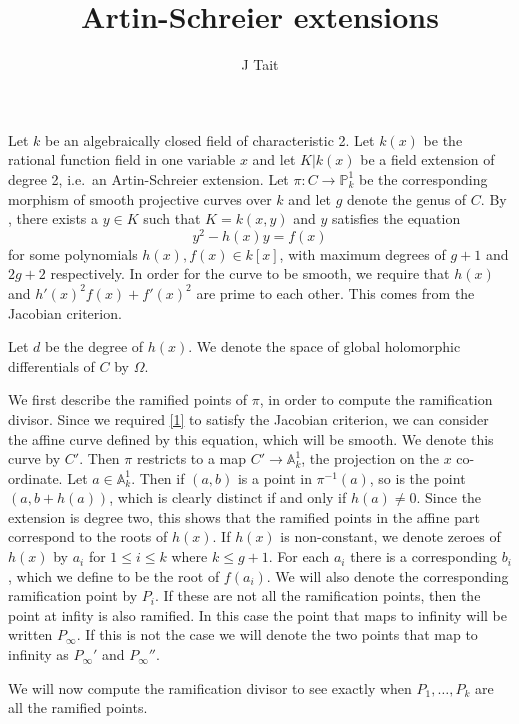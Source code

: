 \documentclass[11pt]{article} %
\title{Artin-Schreier extensions}
\author{J Tait}
\theoremstyle{remark}\newtheorem*{rem}{Remark}
\begin{document}
\maketitle
Let $k$ be an algebraically closed field of characteristic 2.
Let $k(x)$ be the rational function field in one variable $x$ and let $K|k(x)$ be a field extension of degree 2, i.e.\ an Artin-Schreier extension.
Let $\pi:C \rightarrow \mathbb P_k^1$ be the corresponding morphism of smooth projective curves over $k$ and let $g$ denote the genus of $C$.
By \cite[\S 7.4.3]{liu}, there exists a $y\in K$ such that $K=k(x,y)$ and $y$ satisfies the equation
\begin{equation}\label{1}
  y^2 - h(x)y = f(x)
\end{equation}
for some polynomials $h(x), f(x)\in k[x]$, with maximum degrees of $g+1$ and $2g+2$ respectively.
In order for the curve to be smooth, we require that $h(x)$ and $h'(x)^2f(x) + f'(x)^2$ are prime to each other.
This comes from the Jacobian criterion.

Let $d$ be the degree of $h(x)$.
We denote the space of global holomorphic differentials of $C$ by $\Omega$.

We first describe the ramified points of $\pi$, in order to compute the ramification divisor.
Since we required \ref{1} to satisfy the Jacobian criterion, we can consider the affine curve defined by this equation, which will be smooth.
We denote this curve by $C'$.
Then $\pi$ restricts to a map $C'\rightarrow \mathbb A^1_k$, the projection on the $x$ co-ordinate.
Let $a\in \mathbb A_k^1$.
Then if $(a,b)$ is a point in $\pi^{-1}(a)$, so is the point $(a,b+h(a))$, which is clearly distinct if and only if $h(a)\neq 0$.
Since the extension is degree two, this shows that the ramified points in the affine part correspond to the roots of $h(x)$.
If $h(x)$ is non-constant, we denote zeroes of $h(x)$ by $a_i$ for $1\leq i \leq k$ where $k \leq g+1$.
For each $a_i$ there is a corresponding $b_i$, which we define to be the root of $f(a_i)$.
We will also denote the corresponding ramification point by $P_i$.
If these are not all the ramification points, then the point at infity is also ramified.
In this case the point that maps to infinity will be written $P_{\infty}$.
If this is not the case we will denote the two points that map to infinity as $P_{\infty}'$ and $P_{\infty}''$.

We will now compute the ramification divisor to see exactly when $P_1,\ldots,P_k$ are all the ramified points.\\
\end{document}
